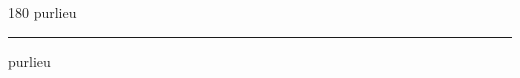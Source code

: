
\begin{frame}
\begin{center}
\begin{turn}{180}
{\fontsize{2.5cm}{1em}\selectfont purlieu}
\end{turn}
\vspace{1em}\par  
\hrule
\vspace{1em}\par  
{\fontsize{2.5cm}{1em}\selectfont purlieu}
\end{center}
\end{frame}
